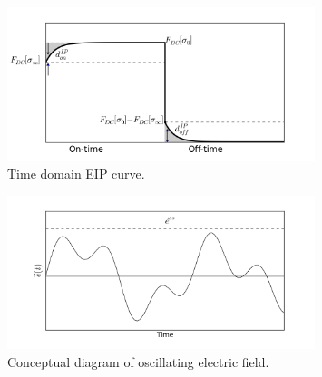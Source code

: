 \documentclass[a4paper, 11pt]{article}
\begin{document}
\begin{figure}[htb]
  \centering
  \includegraphics[width=0.8\textwidth]{figures/EIPcurve.png}
  \caption{Time domain EIP curve. }
  \label{Fig:EIPcurve}
\end{figure}
\begin{figure}[htb]
  \centering
  \includegraphics[width=0.8\textwidth]{figures/Oscillating_e.png}
  \caption{Conceptual diagram of oscillating electric field.}
  \label{Fig:Oscillating_e}
\end{figure}
\clearpage

\end{document}
